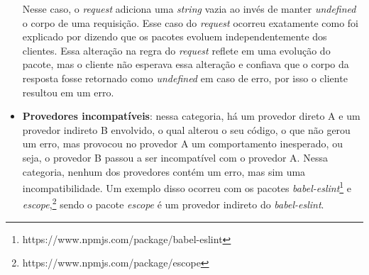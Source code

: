 \begin{itemize}
    Nesse caso, o \textit{request} adiciona uma \textit{string} vazia ao invés de manter \textit{undefined} o corpo de uma requisição. Esse caso do \textit{request} ocorreu exatamente como foi explicado por  dizendo que os pacotes evoluem independentemente dos clientes. Essa alteração na regra do \textit{request} reflete em uma evolução do pacote, mas o cliente não esperava essa alteração e confiava que o corpo da resposta fosse retornado como \textit{undefined} em caso de erro, por isso o cliente resultou em um erro.

    \item \textbf{Provedores incompatíveis}: nessa categoria, há um provedor direto A e um provedor indireto B envolvido, o qual alterou o seu código, o que não gerou um erro, mas provocou no provedor A um comportamento inesperado, ou seja, o provedor B passou a ser incompatível com o provedor A. Nessa categoria, nenhum dos provedores contém um erro, mas sim uma incompatibilidade. Um exemplo disso ocorreu com os pacotes \textit{babel-eslint}\footnote{https://www.npmjs.com/package/babel-eslint} e \textit{escope},\footnote{https://www.npmjs.com/package/escope} sendo o pacote \textit{escope} é um provedor indireto do \textit{babel-eslint}.


\end{itemize}
